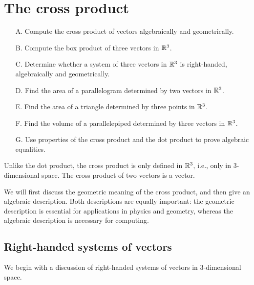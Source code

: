 \section{The cross product}

\begin{outcome}
\begin{enumerate}
\item[A.] Compute the cross product of vectors algebraically and
  geometrically.
\item[B.] Compute the box product of three vectors in $\mathbb{R}^3$. 
\item[C.] Determine whether a system of three vectors in $\mathbb{R}^3$ is
  right-handed, algebraically and geometrically.
\item[D.] Find the area of a parallelogram determined by two vectors
  in $\mathbb{R}^3$.
\item[E.] Find the area of a triangle determined by three points in
  $\mathbb{R}^3$.
\item[F.] Find the volume of a parallelepiped determined by three
  vectors in $\mathbb{R}^3$.
\item[G.] Use properties of the cross product and the dot product to
  prove algebraic equalities.
\end{enumerate}
\end{outcome}

Unlike the dot product, the cross product is only defined in $\mathbb{R}^3$,
i.e., only in 3-dimensional space. The cross product of two vectors is
a vector.

We will first discuss the geometric meaning of the cross product, and
then give an algebraic description. Both descriptions are equally
important: the geometric description is essential for applications in
physics and geometry, whereas the algebraic description is necessary
for computing.

\subsection{Right-handed systems of vectors}

We begin with a discussion of right-handed systems of vectors in
3-dimensional
space.

